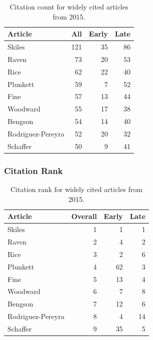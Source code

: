 \documentclass[
  10pt,
  letterpaper,
  DIV=11,
  numbers=noendperiod,
  twoside]{scrartcl}
\begin{document}
\begin{longtable}[]{@{}lrrr@{}}

\caption{\label{tbl-citation-count-2015}Citation count for widely cited
articles from 2015.}

\tabularnewline

\toprule\noalign{}
Article & All & Early & Late \\
\midrule\noalign{}
\endhead
\bottomrule\noalign{}
\endlastfoot
Skiles & 121 & 35 & 86 \\
Raven & 73 & 20 & 53 \\
Rice & 62 & 22 & 40 \\
Plunkett & 59 & 7 & 52 \\
Fine & 57 & 13 & 44 \\
Woodward & 55 & 17 & 38 \\
Bengson & 54 & 14 & 40 \\
Rodriguez-Pereyra & 52 & 20 & 32 \\
Schaffer & 50 & 9 & 41 \\

\end{longtable}

\subsubsection*{Citation Rank}\label{sec-rank-2015}

\begin{longtable}[]{@{}lrrr@{}}

\caption{\label{tbl-citation-rank-2015}Citation rank for widely cited
articles from 2015.}

\tabularnewline

\toprule\noalign{}
Article & Overall & Early & Late \\
\midrule\noalign{}
\endhead
\bottomrule\noalign{}
\endlastfoot
Skiles & 1 & 1 & 1 \\
Raven & 2 & 4 & 2 \\
Rice & 3 & 2 & 6 \\
Plunkett & 4 & 62 & 3 \\
Fine & 5 & 13 & 4 \\
Woodward & 6 & 7 & 8 \\
Bengson & 7 & 12 & 6 \\
Rodriguez-Pereyra & 8 & 4 & 14 \\
Schaffer & 9 & 35 & 5 \\

\end{longtable}
\end{document}
